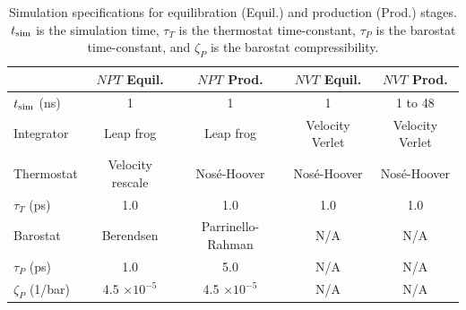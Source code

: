 \documentclass[preprint,review,12pt]{elsarticle}
\begin{document}

	\begin{table}[htbp!]
		\caption{Simulation specifications for equilibration (Equil.) and production (Prod.) stages. $t_{\rm sim}$ is the simulation time, $\tau_{T}$ is the thermostat time-constant, $\tau_{P}$ is the barostat time-constant, and $\zeta_{P}$ is the barostat compressibility.} \label{tab:thermostats_barostats}
		\begin{tabular}{|l|c|c|c|c|}
			\hline
			& $NPT$ Equil. & $NPT$ Prod. & $NVT$ Equil. & $NVT$ Prod. \\ \hline
			$t_{\rm sim}$ (ns) & 1 & 1 & 1 & 1 to 48 \\ \hline
			Integrator & Leap frog \cite{Hockney1974} & Leap frog & Velocity Verlet \cite{Swope1982} & Velocity Verlet \\ \hline 
			Thermostat & Velocity rescale \cite{Bussi2007} & Nos{\'e}-Hoover \cite{Hoover1985,Nose1984} & Nos{\'e}-Hoover & Nos{\'e}-Hoover \\ \hline 
			$\tau_{T}$ (ps) & 1.0 & 1.0 & 1.0 & 1.0 \\ \hline
			Barostat & Berendsen \cite{Berendsen1984} & Parrinello-Rahman \cite{Nose1983,Parrinello1981} & N/A & N/A \\ \hline
			$\tau_{P}$ (ps) & 1.0 & 5.0 & N/A & N/A \\ \hline
			$\zeta_{P}$ (1/bar) & 4.5 $\times 10^{-5}$ & 4.5 $\times 10^{-5}$ & N/A & N/A \\
			\hline
		\end{tabular}
	\end{table}
\end{document}
